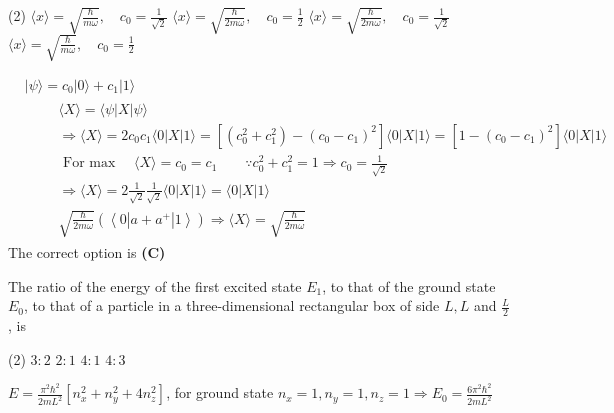 \begin{enumerate}
\begin{minipage}{\textwidth}
\end{minipage}
\begin{tasks}(2)
	\task[\textbf{A.}] $\langle x\rangle=\sqrt{\frac{\hbar}{m \omega}}, \quad c_{0}=\frac{1}{\sqrt{2}}$
	\task[\textbf{B.}]$\langle x\rangle=\sqrt{\frac{\hbar}{2 m \omega}}, \quad c_{0}=\frac{1}{2}$
	\task[\textbf{C.}]$\langle x\rangle=\sqrt{\frac{\hbar}{2 m \omega}}, \quad c_{0}=\frac{1}{\sqrt{2}}$
	\task[\textbf{D.}]$\langle x\rangle=\sqrt{\frac{\hbar}{m \omega}}, \quad c_{0}=\frac{1}{2}$
\end{tasks}
\begin{answer}
	$\begin{aligned}
	&|\psi\rangle=c_{0}|0\rangle+c_{1}|1\rangle \\
	&\qquad \begin{array}{l}
	\langle X\rangle=\langle\psi|X| \psi\rangle \\
	\Rightarrow\langle X\rangle=2 c_{0} c_{1}\langle 0|X| 1\rangle=\left[\left(c_{0}^{2}+c_{1}^{2}\right)-\left(c_{0}-c_{1}\right)^{2}\right]\langle 0|X| 1\rangle=\left[1-\left(c_{0}-c_{1}\right)^{2}\right]\langle 0|X| 1\rangle \\
	\text { For max } \quad\langle X\rangle=c_{0}=c_{1} \quad \quad \because c_{0}^{2}+c_{1}^{2}=1 \Rightarrow c_{0}=\frac{1}{\sqrt{2}} \\
	\Rightarrow\langle X\rangle=2 \frac{1}{\sqrt{2}} \frac{1}{\sqrt{2}}\langle 0|X| 1\rangle=\langle 0|X| 1\rangle \\
	\sqrt{\frac{\hbar}{2 m \omega}}\left(\left\langle 0\left|a+a^{+}\right| 1\right\rangle\right) \Rightarrow\langle X\rangle=\sqrt{\frac{\hbar}{2 m \omega}}
	\end{array}
	\end{aligned}$\\
	The correct option is \textbf{(C)}
\end{answer}
\begin{minipage}{\textwidth}
	\item The ratio of the energy of the first excited state $E_{1}$, to that of the ground state $E_{0}$, to that of a particle in a three-dimensional rectangular box of side $L, L$ and $\frac{L}{2}$, is
\end{minipage}
\begin{tasks}(2)
	\task[\textbf{A.}] $3: 2$
	\task[\textbf{B.}]$2: 1$
	\task[\textbf{C.}]$4: 1$
	\task[\textbf{D.}]$4: 3$
\end{tasks}
\begin{answer}
	$E=\frac{\pi^{2} \hbar^{2}}{2 m L^{2}}\left[n_{x}^{2}+n_{y}^{2}+4 n_{z}^{2}\right]$, for ground state $n_{x}=1, n_{y}=1, n_{z}=1 \Rightarrow E_{0}=\frac{6 \pi^{2} \hbar^{2}}{2 m L^{2}}$\\

\end{answer}
\end{enumerate}
